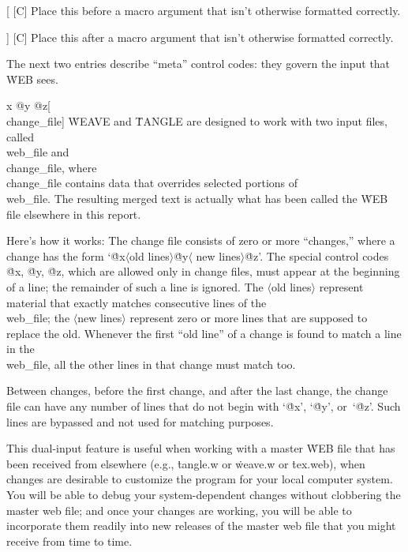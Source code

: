 \@{[} [C] Place this before a macro argument that isn't otherwise formatted
correctly.

\@] [C] Place this after a macro argument that isn't otherwise formatted
correctly.

\yskip\noindent
The next two entries describe ``meta'' control codes: they govern the
input that \.{WEB} sees.

\@{x @y @z}[\\{change\_file}]
\.{WEAVE} and \.{TANGLE} are designed to work with two input files,
called \\{web\_file} and \\{change\_file}, where \\{change\_file} contains
data that overrides selected portions of \\{web\_file}. The resulting merged
text is actually what has been called the \.{WEB} file elsewhere in this
report.

\more Here's how it works: The change file consists of zero or more ``changes,''
where a change has the form `\.{@x}$\langle$old lines$\rangle$\.{@y}$\langle$%
new lines$\rangle$\.{@z}'. The special control codes \.{@x}, \.{@y}, \.{@z},
which are allowed only in change files, must appear at the beginning of a line;
the remainder of such a line is ignored.
The $\langle$old lines$\rangle$ represent material that exactly matches
consecutive lines of the \\{web\_file}; the $\langle$new lines$\rangle$
represent zero or more lines that are supposed to replace the old. Whenever
the first ``old line'' of a change is found to match a line in the
\\{web\_file}, all the other lines in that change must match too.

\more Between changes, before the first change, and after the last change,
the change file can have any number of lines that do not begin with
`\.{@x}', `\.{@y}', or~`\.{@z}'. Such lines are bypassed and not used for
matching purposes.

\more This dual-input feature is useful when working with a master \.{WEB} file
that has been received from elsewhere (e.g., \.{tangle.w} or
\.{weave.w} or \.{tex.web}), when changes are desirable to customize the
program for your local computer system. You will be able to debug your
system-dependent changes without clobbering the master web file; and once
your changes are working, you will be able to incorporate them readily
into new releases of the master web file that you might receive from time
to time.

